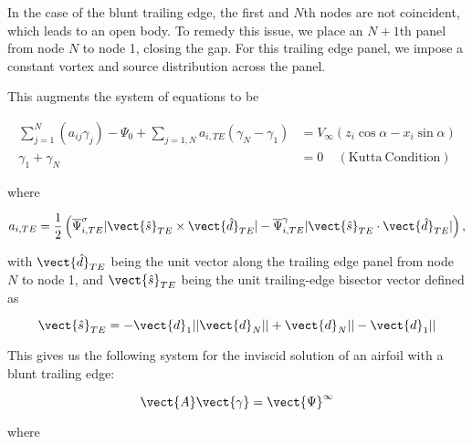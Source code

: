 In the case of the blunt trailing edge, the first and \(N\)th nodes are not coincident, which leads to an open body.  To remedy this issue, we place an \(N+1\)th panel from node \(N\) to node 1, closing the gap.  For this trailing edge panel, we impose a constant vortex and source distribution across the panel.

This augments the system of equations to be

\begin{equation}
	\begin{aligned}
		\sum_{j=1}^N(a_{ij}\gamma_j) - \Psi_0 + \sum_{j=1,N} a_{i,TE}(\gamma_N -\gamma_{1}) &= V_\infty(z_i\cos\alpha - x_i\sin\alpha) \\
		\gamma_1 + \gamma_N &= 0 ~~~~~\mathrm{(Kutta~Condition)}
	\end{aligned}
\end{equation}

\noindent where 

\begin{equation}
	a_{i,TE} = \frac{1}{2} \left( \overline{\Psi}^\sigma_{i,TE} | \vect{\hat{s}}_{TE} \times \vect{\hat{d}}_{TE}| -  \overline{\Psi}^\gamma_{i,TE} | \vect{\hat{s}}_{TE} \cdot  \vect{\hat{d}}_{TE} |\right),
\end{equation}

\noindent with \(\vect{\hat{d}}_{TE}\) being the unit vector along the trailing edge panel from node \(N\) to node 1, 
and \(\vect{\hat{s}}_{TE}\) being the unit trailing-edge bisector vector defined as

\begin{equation}
	\vect{\hat{s}}_{TE} = -\vect{d}_{1} ||\vect{d}_N|| + \vect{d}_N ||-\vect{d}_{1}||
\end{equation}


This gives us the following system for the inviscid solution of an airfoil with a blunt trailing edge:

\begin{equation}
	\vect{A}\vect{\gamma} = \vect{\Psi}^\infty
\end{equation}

\noindent where

